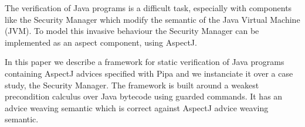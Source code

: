 The verification of Java programs is a difficult task, especially with
components like the Security Manager which modify the semantic of the
Java Virtual Machine (JVM).  
To model this invasive behaviour  the Security Manager 
can be implemented as an aspect component, using AspectJ.

In this paper we describe a framework for static verification of Java
programs containing AspectJ advices specified with Pipa and
we instanciate it over a case study, the Security Manager.  The
framework is built around a weakest precondition calculus over Java
bytecode using guarded commands. It has an advice weaving 
semantic which is correct against AspectJ advice weaving semantic.  


